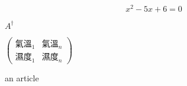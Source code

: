 \documentclass[12pt]{article}
\begin{document}
\begin{CJK*}{UTF8}{bkai}
	\begin{equation} \label{eq:QQQ}
		x^2 - 5 x + 6 = 0
	\end{equation}

	${A^{\dagger}}$
		
	$\begin{pmatrix} 
		\text{氣溫}_1 & \text{氣溫}_n \\
		\text{濕度}_1 & \text{濕度}_n 
	\end{pmatrix}$\par

	
	\newpage\mbox{}\newpage\mbox{}\newpage
	
	an article~\cite{RN42}
	
	
\end{CJK*}
\end{document}
